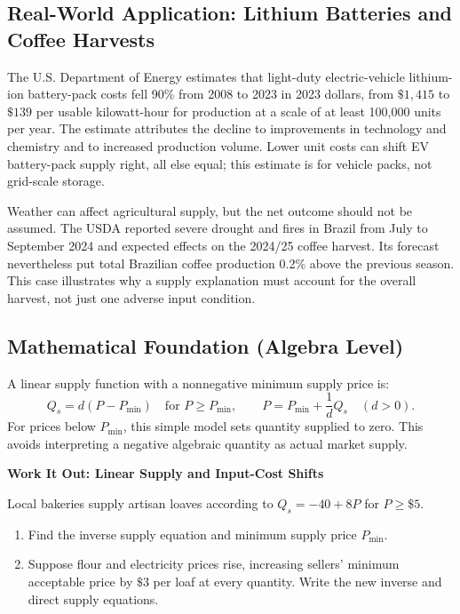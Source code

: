 \documentclass[11pt,letterpaper]{article}
\begin{document}
\subsection*{Real-World Application: Lithium Batteries and Coffee Harvests}
The U.S. Department of Energy estimates that light-duty electric-vehicle lithium-ion battery-pack costs fell 90\% from 2008 to 2023 in 2023 dollars, from $\$1{,}415$ to $\$139$ per usable kilowatt-hour for production at a scale of at least 100{,}000 units per year. The estimate attributes the decline to improvements in technology and chemistry and to increased production volume. Lower unit costs can shift EV battery-pack supply right, all else equal; this estimate is for vehicle packs, not grid-scale storage.

Weather can affect agricultural supply, but the net outcome should not be assumed. The USDA reported severe drought and fires in Brazil from July to September 2024 and expected effects on the 2024/25 coffee harvest. Its forecast nevertheless put total Brazilian coffee production 0.2\% above the previous season. This case illustrates why a supply explanation must account for the overall harvest, not just one adverse input condition.

\subsection*{Mathematical Foundation (Algebra Level)}
A linear supply function with a nonnegative minimum supply price is:
\begin{equation}
Q_s = d(P-P_{\min}) \quad \text{for } P \ge P_{\min}, \qquad
P = P_{\min} + \frac{1}{d}Q_s \quad (d>0).
\end{equation}
For prices below $P_{\min}$, this simple model sets quantity supplied to zero. This avoids interpreting a negative algebraic quantity as actual market supply.

\noindent\textbf{Work It Out: Linear Supply and Input-Cost Shifts}

\noindent Local bakeries supply artisan loaves according to $Q_s = -40 + 8P$ for $P \ge \$5$.
\begin{enumerate}
    \item Find the inverse supply equation and minimum supply price $P_{\min}$.
    \item Suppose flour and electricity prices rise, increasing sellers' minimum acceptable price by $\$3$ per loaf at every quantity. Write the new inverse and direct supply equations.
\end{enumerate}
\end{document}
